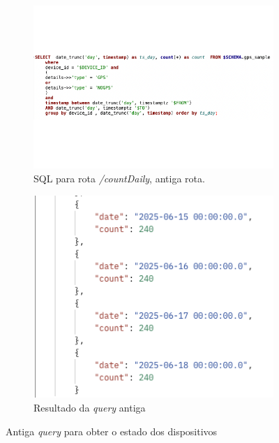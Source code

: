 


\begin{figure}[!h]
	\centering
	\begin{subfigure}[c]{0.45\textwidth}
		\centering
		\includegraphics[width=\textwidth]{figs/sqlCountDaily.png}
		\caption{SQL para rota \textit{/countDaily}, antiga rota.}
		\label{fig:sqlCountDaily}
	\end{subfigure}
	\hfill
	\begin{subfigure}[c]{0.45\textwidth}
        \centering
        \includegraphics[width=\textwidth]{figs/return_old_query.png}
		\caption{Resultado da \textit{query} antiga}
        \label{fig:returnOldQuery}
	\end{subfigure}
	\caption{Antiga \textit{query} para obter o estado dos dispositivos}
\end{figure}


